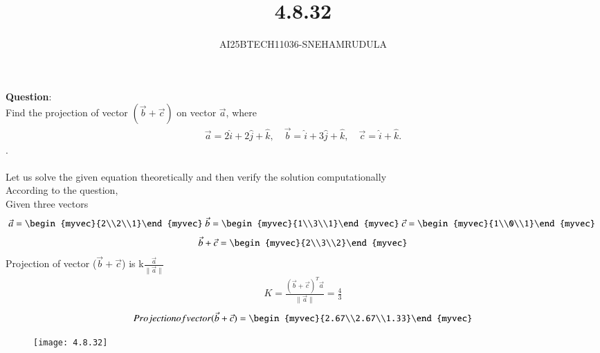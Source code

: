 \documentclass[journal]{IEEEtran}
\begin{document}

\vspace{3cm}

\title{4.8.32}
\author{AI25BTECH11036-SNEHAMRUDULA}
 \maketitle
{\let\newpage\relax\maketitle}
\renewcommand{\thefigure}{\theenumi}
\renewcommand{\thetable}{\theenumi}
\setlength{\intextsep}{10pt} %
\renewcommand{\thetable}{\theenumi}
\textbf{Question}:\\
 Find the projection of vector $(\vec{b}+\vec{c})$ on vector $\vec{a}$, where 
\begin{align}
\vec{a} = 2\hat{i} + 2\hat{j} + \hat{k}, \quad 
\vec{b} = \hat{i} + 3\hat{j} + \hat{k}, \quad 
\vec{c} = \hat{i} + \hat{k}.
\end{align}.\\
\solution \\
Let us solve the given equation theoretically and then verify the solution computationally \\
According to the question, \\
Given three vectors\\
\begin{align}
\vec{a}=\begin{myvec}{2\\2\\1}\end{myvec}\
\vec{b}=\begin{myvec}{1\\3\\1}\end{myvec}\
\vec{c}=\begin{myvec}{1\\0\\1}\end{myvec}\
\end{align}
   \begin{align}
 \vec{b}+\vec{c}=\begin{myvec}{2\\3\\2}\end{myvec}
\end{align}
Projection of vector ($\vec{b}+\vec{c}$) is k$\frac{\vec{a}}{\|\vec{a}\|}$
\begin{align}
    K=\frac{(\vec{b}+\vec{c})^T\vec{a}}{\|\vec{a}\|}=\frac{4}{3}
\end{align}
\begin{align}
Projection of vector (\vec{b}+\vec{c})=\begin{myvec}{2.67\\2.67\\1.33}\end{myvec}    
\end{align}
\begin{figure}[h!]
    \centering
    \texttt{[image: 4.8.32]}
    \label{figure_1}
\end{figure}
 
\end{document}

